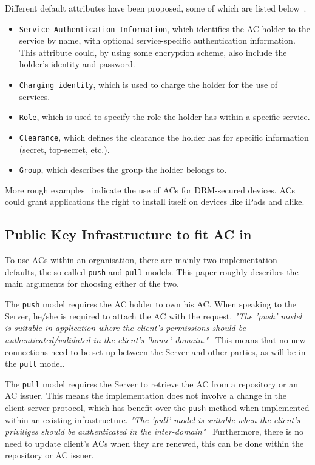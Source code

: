 \documentclass[10pt,conference,a4paper]{IEEEtran}
\begin{document}
Different default attributes have been proposed, some of which are listed below~\cite{benantar2006access,rfc_ac}.
\begin{itemize}
	\item \texttt{Service Authentication Information}, which identifies the AC holder to the service by name, with optional service-specific authentication information. This attribute could, by using some encryption scheme, also include the holder's identity and password.
	\item \texttt{Charging identity}, which is used to charge the holder for the use of services.
	\item \texttt{Role}, which is used to specify the role the holder has within a specific service.
	\item \texttt{Clearance}, which defines the clearance the holder has for specific information (secret, top-secret, etc.).
	\item \texttt{Group}, which describes the group the holder belongs to.
\end{itemize}

More rough examples~\cite{tilborg2011encyclopedia} indicate the use of ACs for DRM-secured devices. ACs could grant applications the right to install itself on devices like iPads and alike.

\subsection{Public Key Infrastructure to fit AC in}
To use ACs within an organisation, there are mainly two implementation defaults, the so called \texttt{push} and \texttt{pull} models. This paper roughly describes the main arguments for choosing either of the two.

The \texttt{push} model requires the AC holder to own his AC. When speaking to the Server, he/she is required to attach the AC with the request. \textit{"The 'push' model is suitable in application where the client's permissions should be authenticated/validated in the client's 'home' domain."}~\cite{godavari2001secure} This means that no new connections need to be set up between the Server and other parties, as will be in the \texttt{pull} model.

The \texttt{pull} model requires the Server to retrieve the AC from a repository or an AC issuer. This means the implementation does not involve a change in the client-server protocol, which has benefit over the \texttt{push} method when implemented within an existing infrastructure. \textit{"The 'pull' model is suitable when the client's priviliges should be authenticated in the inter-domain"}~\cite{godavari2001secure} Furthermore, there is no need to update client's ACs when they are renewed, this can be done within the repository or AC issuer.
\end{document}
